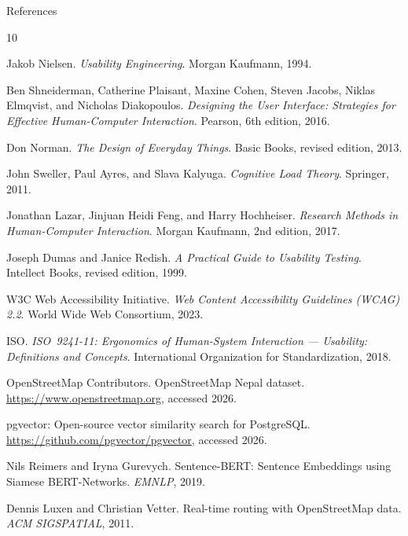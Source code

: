 \documentclass[aspectratio=169,professionalfonts]{beamer}
\begin{document}
\begin{frame}[allowframebreaks]{References}
  \tiny
  \begin{thebibliography}{10}

    Jakob Nielsen.
    \newblock \emph{Usability Engineering}.
    \newblock Morgan Kaufmann, 1994.

    Ben Shneiderman, Catherine Plaisant, Maxine Cohen, Steven Jacobs,
    Niklas Elmqvist, and Nicholas Diakopoulos.
    \newblock \emph{Designing the User Interface: Strategies for Effective
      Human-Computer Interaction}.
    \newblock Pearson, 6th edition, 2016.

    Don Norman.
    \newblock \emph{The Design of Everyday Things}.
    \newblock Basic Books, revised edition, 2013.

    John Sweller, Paul Ayres, and Slava Kalyuga.
    \newblock \emph{Cognitive Load Theory}.
    \newblock Springer, 2011.

    Jonathan Lazar, Jinjuan Heidi Feng, and Harry Hochheiser.
    \newblock \emph{Research Methods in Human-Computer Interaction}.
    \newblock Morgan Kaufmann, 2nd edition, 2017.

    Joseph Dumas and Janice Redish.
    \newblock \emph{A Practical Guide to Usability Testing}.
    \newblock Intellect Books, revised edition, 1999.

    W3C Web Accessibility Initiative.
    \newblock \emph{Web Content Accessibility Guidelines (WCAG) 2.2}.
    \newblock World Wide Web Consortium, 2023.

    ISO.
    \newblock \emph{ISO~9241-11: Ergonomics of Human-System Interaction ---
      Usability: Definitions and Concepts}.
    \newblock International Organization for Standardization, 2018.

    OpenStreetMap Contributors.
    \newblock OpenStreetMap Nepal dataset.
    \newblock \url{https://www.openstreetmap.org}, accessed 2026.

    pgvector: Open-source vector similarity search for PostgreSQL.
    \newblock \url{https://github.com/pgvector/pgvector}, accessed 2026.

    Nils Reimers and Iryna Gurevych.
    \newblock Sentence-BERT: Sentence Embeddings using Siamese BERT-Networks.
    \newblock \emph{EMNLP}, 2019.

    Dennis Luxen and Christian Vetter.
    \newblock Real-time routing with OpenStreetMap data.
    \newblock \emph{ACM SIGSPATIAL}, 2011.

  \end{thebibliography}
\end{frame}
\end{document}
